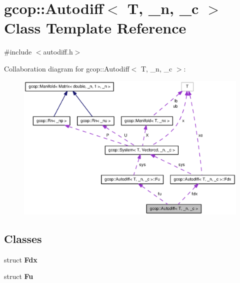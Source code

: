 \section{gcop\-:\-:\-Autodiff$<$ \-T, \-\_\-n, \-\_\-c $>$ \-Class \-Template \-Reference}
\label{classgcop_1_1Autodiff}


{\ttfamily \#include $<$autodiff.\-h$>$}



\-Collaboration diagram for gcop\-:\-:\-Autodiff$<$ \-T, \-\_\-n, \-\_\-c $>$\-:\nopagebreak
\begin{figure}[H]
\begin{center}
\leavevmode
\includegraphics[width=350pt]{classgcop_1_1Autodiff__coll__graph}
\end{center}
\end{figure}
\subsection*{\-Classes}
\begin{DoxyCompactItemize}
\item 
struct {\bf \-Fdx}
\item 
struct {\bf \-Fu}
\end{DoxyCompactItemize}
